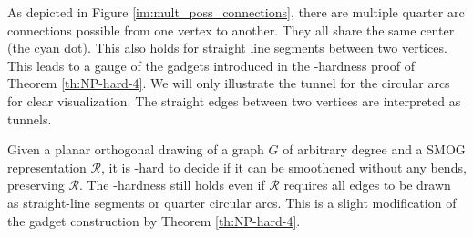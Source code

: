 As depicted in Figure \ref{im:mult_poss_connections}, there are multiple quarter arc connections possible from one vertex to another. They all share the same center (the cyan dot). This also holds for straight line segments between two vertices. This leads to a gauge of the gadgets introduced in the \NP-hardness proof of Theorem \ref{th:NP-hard-4}. We will only illustrate the tunnel for the circular arcs for 	clear visualization. The straight edges between two vertices are interpreted as tunnels.
\begin{theorem}
	Given a planar orthogonal drawing of a graph $G$ of arbitrary degree and a SMOG representation $\mathcal{R}$, it is \NP-hard to decide if it can be smoothened without any bends, preserving $\mathcal{R}$. The \NP-hardness still holds even if $\mathcal{R}$ requires all edges to be drawn as straight-line segments or quarter circular arcs. This is a slight modification of the gadget construction by Theorem \ref{th:NP-hard-4}.\label{th:NP-hard-m} 
\end{theorem}

